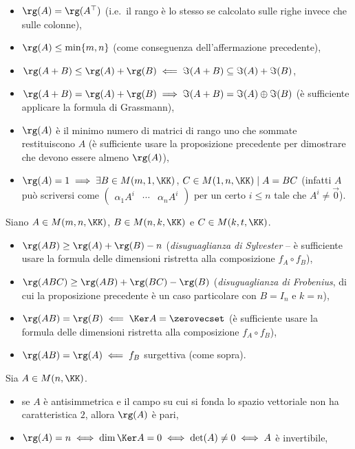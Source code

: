 \documentclass[10pt,landscape]{article}
\begin{document}
\begin{multicols}{3}
		\begin{itemize}
			\item $\rg(A) = \rg(A^\top)$ (i.e.~il rango è lo stesso se calcolato
			sulle righe invece che sulle colonne),
			\item $\rg(A) \leq \min\{m, n\}$ (come conseguenza dell'affermazione
			precedente),
			\item $\rg(A+B) \leq \rg(A) + \rg(B) \impliedby \Im (A+B) \subseteq
			\Im(A) + \Im(B)$,
			\item $\rg(A+B) = \rg(A) + \rg(B) \implies \Im(A+B) = \Im(A) \oplus \Im(B)$ (è sufficiente applicare la formula di Grassmann),
			\item $\rg(A)$ è il minimo numero di matrici di rango uno che
			sommate restituiscono $A$ (è sufficiente usare la proposizione
			precedente per dimostrare che devono essere almeno $\rg(A)$),
			\item $\rg(A)=1 \implies \exists B \in M(m, 1, \KK)$, $C \in M(1, n, \KK) \mid A=BC$ (infatti $A$ può scriversi come $\begin{pmatrix}\alpha_1 A^i & \cdots & \alpha_n A^i \end{pmatrix}$ per un certo $i \leq n$ tale che $A^i \neq \vec{0}$).
		\end{itemize}
		
		Siano $A \in M(m, n, \KK)$, $B \in M(n, k, \KK)$ e $C \in M(k, t, \KK)$.
		
		\begin{itemize}
			\item $\rg(AB) \geq \rg(A) + \rg(B) - n$ (\textit{disuguaglianza
				di Sylvester} -- è sufficiente
			usare la formula delle dimensioni ristretta alla composizione
			$f_A \circ f_B$),
			\item $\rg(ABC) \geq \rg(AB) + \rg(BC) - \rg(B)$ (\textit{disuguaglianza di Frobenius}, di cui la proposizione
			precedente è un caso particolare con $B = I_n$ e $k=n$),
			\item $\rg(AB) = \rg(B) \impliedby \Ker A = \zerovecset$ (è
			sufficiente usare la formula delle dimensioni ristretta
			alla composizione $f_A \circ f_B$),
			\item $\rg(AB) = \rg(A) \impliedby f_B$ surgettiva (come sopra).
		\end{itemize}
		
		Sia $A \in M(n, \KK)$.
		
		\begin{itemize}
			\item se $A$ è antisimmetrica e il campo su cui si fonda
			lo spazio vettoriale non ha caratteristica $2$, allora
			$\rg(A)$ è pari,
			\item $\rg(A) = n \iff \dim \Ker A = 0 \iff \det(A) \neq 0 \iff A$ è invertibile,
		\end{itemize}
		

\end{multicols}
\end{document}
